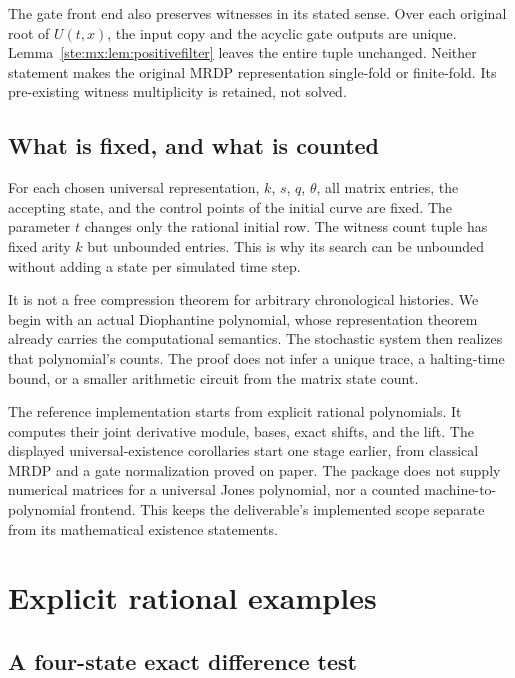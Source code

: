 \documentclass[11pt,letterpaper]{article}
\theoremstyle{definition}
\theoremstyle{remark}
\begin{document}
The gate front end also preserves witnesses in its stated sense. Over each
original root of $U(t,x)$, the input copy and the acyclic gate outputs are
unique. Lemma~\ref{ste:mx:lem:positivefilter} leaves the entire tuple unchanged.
Neither statement makes the original MRDP representation single-fold or
finite-fold. Its pre-existing witness multiplicity is retained, not solved.

\subsection{What is fixed, and what is counted}

For each chosen universal representation, $k$, $s$, $q$, $\theta$, all matrix
entries, the accepting state, and the control points of the initial curve are
fixed. The parameter $t$ changes only the rational initial row. The witness
count tuple has fixed arity $k$ but unbounded entries. This is why its search
can be unbounded without adding a state per simulated time step.

It is not a free compression theorem for arbitrary chronological histories.
We begin with an actual Diophantine polynomial, whose representation theorem
already carries the computational semantics. The stochastic system then
realizes that polynomial's counts. The proof does not infer a unique trace,
a halting-time bound, or a smaller arithmetic circuit from the matrix state
count.

The reference implementation starts from explicit rational polynomials. It
computes their joint derivative module, bases, exact shifts, and the lift.
The displayed universal-existence corollaries start one stage earlier, from
classical MRDP and a gate normalization proved on paper. The package does not
supply numerical matrices for a universal Jones polynomial, nor a counted
machine-to-polynomial frontend. This keeps the deliverable's implemented scope
separate from its mathematical existence statements.

\section{Explicit rational examples}\label{ste:mx:sec:examples}

\subsection{A four-state exact difference test}
\end{document}
